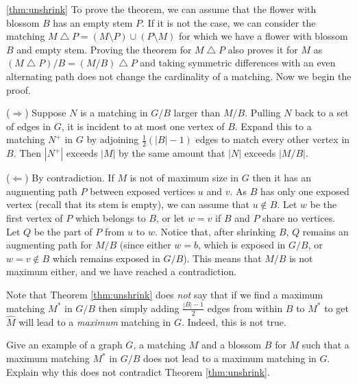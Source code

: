 \documentclass[12pt]{article}
\begin{document}
\begin{proof_of}{\ref{thm:unshrink}}
To prove the theorem, we can assume that the flower with blossom $B$ has an empty stem $P$. If it is not the case, we can consider the matching $M\bigtriangleup P=(M\setminus P)\cup (P\setminus M)$ for which we have a flower with blossom $B$ and empty stem. Proving the theorem for $M\bigtriangleup P$ also proves it for $M$ as $(M\bigtriangleup P)/B =(M/B)\bigtriangleup P$ and taking symmetric differences with an even alternating path does not change the cardinality of a matching. Now we begin the proof.


($\Longrightarrow$)  Suppose $N$ is a matching in $G/B$ larger
than $M/B$.  Pulling $N$ back to a set of edges in $G$,
it is incident to at most one vertex of $B$.  Expand this to a
matching $N^+$ in $G$ by adjoining $\frac{1}{2}(|B|-1)$ edges
to match every other vertex in $B$.  Then $|N^+|$ exceeds $|M|$
by the same amount that $|N|$ exceeds $|M/B|$.

($\Longleftarrow$) By contradiction. If $M$ is not of maximum size in
$G$ then it has an augmenting path $P$ between exposed vertices $u$
and $v$. As $B$ has only one exposed vertex (recall that its stem is empty), we can assume that $u\notin B$. Let $w$ be the first vertex of $P$ which belongs to $B$, or let $w=v$ if $B$ and $P$ share no vertices. Let $Q$ be the part of $P$ from $u$ to $w$. Notice that, after
shrinking $B$, $Q$ remains an augmenting path for $M/B$ (since either $w=b$, which is
exposed in $G/B$, or $w = v \not\in B$ which remains exposed in $G/B$). This means that $M/B$ is not maximum either, and we
have reached a contradiction.
\end{proof_of}

Note that Theorem \ref{thm:unshrink} does {\it not} say
that if we find a maximum matching $M^*$ in $G/B$ then simply adding
$\frac{|B|-1}{2}$ edges from within $B$ to $M^*$ to get $\hat{M}$ will
lead to a {\it maximum} matching in $G$. Indeed, this is not true. 

\begin{exercises}
\item
Give an example of a graph $G$, a matching $M$ and a blossom $B$ for
$M$ such that a maximum matching $M^*$ in $G/B$ does not lead to a
maximum matching in $G$. Explain why this does not contradict Theorem
\ref{thm:unshrink}. 
\end{exercises}
\end{document}
